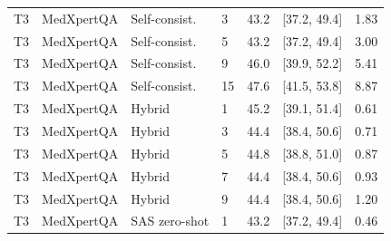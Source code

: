 \begin{table}[t]
\begin{tabular}{@{}llllrrr@{}}
T3 & MedXpertQA & Self-consist. & 3 & 43.2 & [37.2, 49.4] & 1.83 \\
T3 & MedXpertQA & Self-consist. & 5 & 43.2 & [37.2, 49.4] & 3.00 \\
T3 & MedXpertQA & Self-consist. & 9 & 46.0 & [39.9, 52.2] & 5.41 \\
T3 & MedXpertQA & Self-consist. & 15 & 47.6 & [41.5, 53.8] & 8.87 \\
T3 & MedXpertQA & Hybrid & 1 & 45.2 & [39.1, 51.4] & 0.61 \\
T3 & MedXpertQA & Hybrid & 3 & 44.4 & [38.4, 50.6] & 0.71 \\
T3 & MedXpertQA & Hybrid & 5 & 44.8 & [38.8, 51.0] & 0.87 \\
T3 & MedXpertQA & Hybrid & 7 & 44.4 & [38.4, 50.6] & 0.93 \\
T3 & MedXpertQA & Hybrid & 9 & 44.4 & [38.4, 50.6] & 1.20 \\
T3 & MedXpertQA & SAS zero-shot & 1 & 43.2 & [37.2, 49.4] & 0.46 \\
\bottomrule
\end{tabular}
\end{table}

